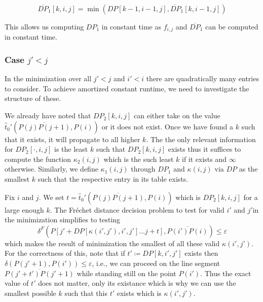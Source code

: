 \begin{observation}
	\[\overline{DP}_1[k,i,j] = \min (DP[k-1, i - 1, j], \overline{DP}_1[k, i - 1, j])\]
\end{observation}

This allows us computing \(DP_1\) in constant time as \(f_{i, j}\) and \(\overline{DP}_1\) can be computed in constant time.


\subsubsection{Case \(j' < j\)}

In the minimization over all \(j' < j\) and \(i' < i\) there are quadratically many entries to consider. To achieve amortized constant runtime, we need to investigate the structure of these. 

We already have noted that \(DP_2[k,i,j]\) can either take on the value \(\hat t_0'(\overline{P(j)P(j+1)}, P(i))\) or it does not exist. Once we have found a \(k\) such that it exists, it will propagate to all higher \(k\). The the only relevant information for \(DP_2[\cdot, i, j]\) is the least \(k\) such that \(DP_2[k,i,j]\) exists thus it suffices to compute the function \(\kappa_2(i,j)\) which is the such least \(k\) if it exists and \(\infty\) otherwise. Similarly, we define \(\kappa_1(i,j)\) through \(DP_1\) and \(\kappa(i,j)\) via \(DP\) as the smallest \(k\) such that the respective entry in its table exists. 

Fix \(i\) and \(j\). We set \(t = \hat t_0'(\overline{P(j)P(j+1)}, P(i))\) which is \(DP_2[k, i, j]\) for a large enough \(k\). The Fréchet distance decision problem to test for valid \(i'\) and \(j'\)in the minimization simplifies to testing 
\begin{equation}\label{eq:dp2-ag}
	\delta^F(P[j' + DP[\kappa(i', j'),i', j'] \dots j + t], \overline{P(i')P(i)}) \leq \varepsilon
\end{equation}
which makes the result of minimization the smallest of all these valid \(\kappa(i', j')\). For the correctness of this, note that if \(t' \coloneq DP[k, i', j']\) exists then \(\delta(P(j' + 1), P(i') ) \leq \varepsilon\), i.e., we can proceed on the line segment \(\overline{P(j' + t')P(j' + 1)}\) while standing still on the point \(P(i')\). Thus the exact value of \(t'\) does not matter, only its existance which is why we can use the smallest possible \(k\) such that this \(t'\) exists which is \(\kappa(i',j')\). 

